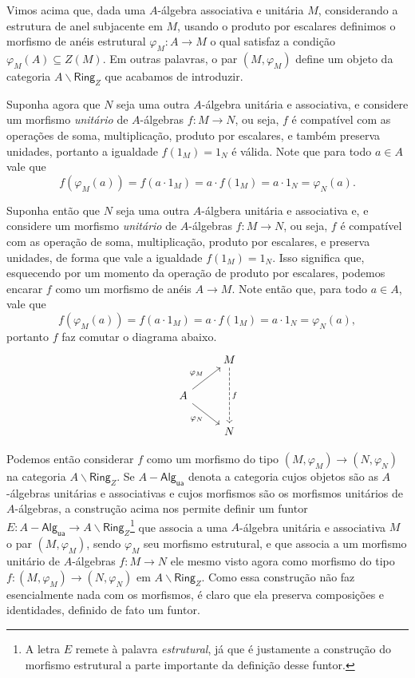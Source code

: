 Vimos acima que, dada uma $A$-álgebra associativa e unitária $M$, considerando a estrutura de anel subjacente em $M$, usando o produto por escalares definimos o morfismo de anéis estrutural $\varphi_{M}: A \to M$ o qual satisfaz a condição $\varphi_{M}(A) \subseteq Z(M)$.
Em outras palavras, o par $(M,\varphi_{M})$ define um objeto da categoria $A \backslash \mathsf{Ring}_{Z}$ que acabamos de introduzir.

Suponha agora que $N$ seja uma outra $A$-álgebra unitária e associativa, e considere um morfismo \emph{unitário} de $A$-álgebras $f: M \to N$, ou seja, $f$ é compatível com as operações de soma, multiplicação, produto por escalares, e também preserva unidades, portanto a igualdade $f(1_{M}) = 1_{N}$ é válida.
Note que para todo $a \in A$ vale que
\begin{displaymath}
  f(\varphi_{M}(a)) = f(a \cdot 1_{M}) = a \cdot f(1_{M}) = a \cdot 1_{N} = \varphi_{N}(a).
\end{displaymath}

Suponha então que $N$ seja uma outra $A$-álgbera unitária e associativa e, e considere um morfismo \emph{unitário} de $A$-álgebras $f: M \to N$, ou seja, $f$ é compatível com as operação de soma, multiplicação, produto por escalares, e preserva unidades, de forma que vale a igualdade $f(1_{M}) = 1_{N}$.
Isso significa que, esquecendo por um momento da operação de produto por escalares, podemos encarar $f$ como um morfismo de anéis $A \to M$.
Note então que, para todo $a \in A$, vale que
\begin{displaymath}
  f(\varphi_{M}(a)) = f(a \cdot 1_{M}) = a \cdot f(1_{M}) = a \cdot 1_{N} = \varphi_{N}(a),
\end{displaymath}
portanto $f$ faz comutar o diagrama abaixo.
\begin{displaymath}
  \begin{tikzcd}
    & M
    \arrow[dd, dashed, "f"]
    \\ A
    \arrow[ru, "\varphi_M"]
    \arrow[rd, "\varphi_N" swap]
    \\ & N
  \end{tikzcd}
\end{displaymath}

Podemos então considerar $f$ como um morfismo do tipo $(M,\varphi_{M}) \to (N,\varphi_{N})$ na categoria $A \backslash \mathsf{Ring}_{Z}$.
Se $A-\mathsf{Alg_{ua}}$ denota a categoria cujos objetos são as $A$-álgebras unitárias e associativas e cujos morfismos são os morfismos unitários de $A$-álgebras, a construção acima nos permite definir um funtor $E: A-\mathsf{Alg_{ua}} \to A \backslash \mathsf{Ring}_{Z}$\footnote{A letra $E$ remete à palavra \emph{estrutural}, já que é justamente a construção do morfismo estrutural a parte importante da definição desse funtor.} que associa a uma $A$-álgebra unitária e associativa $M$ o par $(M,\varphi_{M})$, sendo $\varphi_{M}$ seu morfismo estrutural, e que associa a um morfismo unitário de $A$-álgebras $f: M \to N$ ele mesmo visto agora como morfismo do tipo $f: (M,\varphi_{M}) \to (N,\varphi_{N})$ em $A \backslash \mathsf{Ring}_{Z}$.
Como essa construção não faz esencialmente nada com os morfismos, é claro que ela preserva composições e identidades, definido de fato um funtor.


